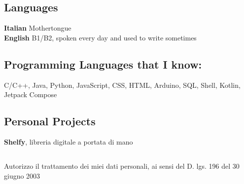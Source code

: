 \documentclass[12pt]{article}
\begin{document}
\subsection*{Languages}
\textbf{Italian} Mothertongue\\
\textbf{English} B1/B2, spoken every day and used to write sometimes
\subsection*{Programming Languages that I know:} C/C++, Java, Python, JavaScript, CSS, HTML, Arduino, SQL, Shell, Kotlin, Jetpack Compose
\subsection*{Personal Projects}
\textbf{Shelfy}, libreria digitale a portata di mano
\subsection*{}
Autorizzo il trattamento dei miei dati personali, ai sensi del D. lgs. 196 del 30 giugno 2003
\end{document}
